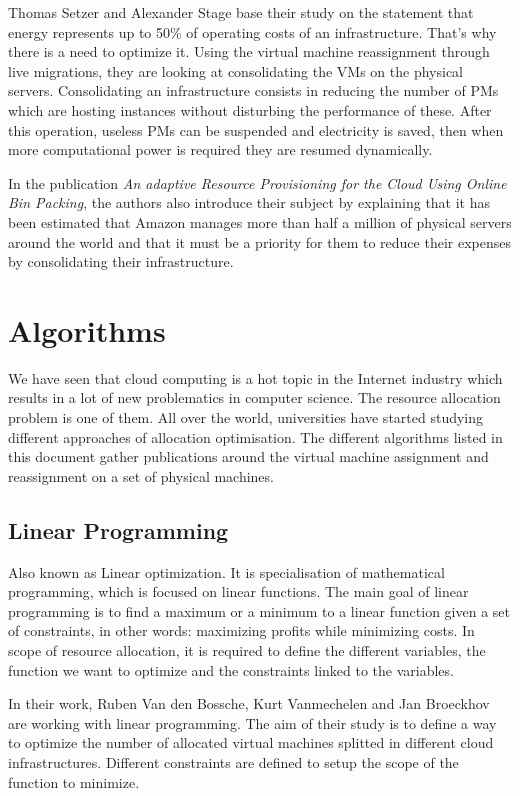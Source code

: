 \documentclass[a4paper,11pt]{article}
\begin{document}
Thomas Setzer and Alexander Stage base their study on the statement that energy
represents up to 50\% of operating costs of an
infrastructure\cite{reassignment:electricitysaving}. That's why there is a need
to optimize it. Using the virtual machine reassignment through live migrations,
they are looking at consolidating the VMs on the physical servers.
Consolidating an infrastructure consists in reducing the number of PMs which
are hosting instances without disturbing the performance of these.  After this
operation, useless PMs can be suspended and electricity is saved, then when
more computational power is required they are resumed dynamically.

In the publication \textit{An adaptive Resource Provisioning for the Cloud
Using Online Bin Packing}\cite{reassignment:binpacking1}, the authors also
introduce their subject by explaining that it has been estimated that Amazon
manages more than half a million of physical servers around the world and that
it must be a priority for them to reduce their expenses by consolidating
their infrastructure.

\section{Algorithms}

We have seen that cloud computing is a hot topic in the Internet industry
which results in a lot of new problematics in computer science. The resource
allocation problem is one of them. All over the world, universities have
started studying different approaches of allocation optimisation. The different
algorithms listed in this document gather publications around the virtual machine
assignment and reassignment on a set of physical machines.

\subsection{Linear Programming}

Also known as Linear optimization. It is specialisation of mathematical
programming, which is focused on linear functions. The main goal of linear
programming is to find a maximum or a minimum to a linear function given a set
of constraints, in other words: maximizing profits while minimizing costs. In
scope of resource allocation, it is required to define the different variables,
the function we want to optimize and the constraints linked to the variables.

In their work, Ruben Van den Bossche, Kurt Vanmechelen and Jan
Broeckhov\cite{allocation:hybrid} are working with linear programming. The aim
of their study is to define a way to optimize the number of allocated virtual
machines splitted in different cloud infrastructures.  Different constraints
are defined to setup the scope of the function to minimize.
\end{document}
